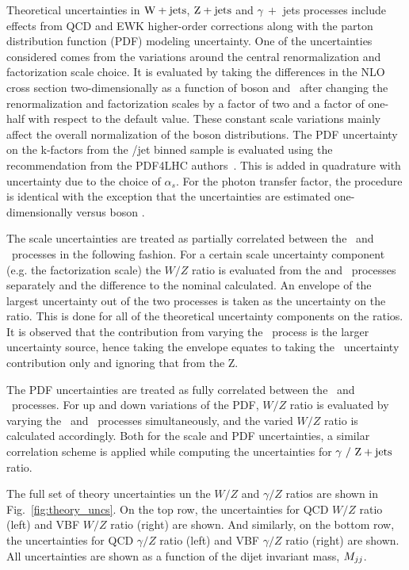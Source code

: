 Theoretical uncertainties in $\mathrm{W}+\textrm{jets}$, $\mathrm{Z}+\textrm{jets}$ and $\gamma \ +$ jets processes include effects from QCD and EWK higher-order
corrections along with the parton distribution function (PDF) modeling uncertainty. One of the uncertainties considered comes from the
variations around the central renormalization and factorization scale choice. It is evaluated by taking the differences in the NLO cross
section two-dimensionally as a function of boson \pt and \mjj~after changing the renormalization and factorization scales by a factor of two 
and a factor of one-half with respect to the default value. These constant scale variations mainly affect the
overall normalization of the boson \pt distributions. 
The PDF uncertainty on the k-factors from the \pt{}/jet binned sample is evaluated using the recommendation from the PDF4LHC authors~\cite{paper:PDF4LHC}. 
This is added in quadrature with uncertainty due to the choice of $\alpha_{s}$.
For the photon transfer factor, the procedure is identical with the exception that the uncertainties are estimated one-dimensionally versus boson \pt{}.

The scale uncertainties are treated as partially correlated between the \Zjets~and \Wjets~processes in the following fashion. 
For a certain scale uncertainty component (e.g. the factorization scale) the $W/Z$ ratio is evaluated from the \Zjets{} and \Wjets~processes 
separately and the difference to the nominal calculated.
An envelope of the largest uncertainty out of the two processes is taken as the uncertainty on the ratio.
This is done for all of the theoretical uncertainty components on the ratios.
It is observed that the contribution from varying the \Wjets~process is the larger uncertainty source,
hence taking the envelope equates to taking the \Wjets~uncertainty contribution only and ignoring that from the Z.

The PDF uncertainties are treated as fully correlated between the \Zjets~and \Wjets~processes. For up and down variations of the PDF, $W/Z$ ratio is 
evaluated by varying the \Wjets~and \Zjets~processes simultaneously, and the varied $W/Z$ ratio is calculated accordingly. 
Both for the scale and PDF uncertainties, a similar correlation scheme is applied while computing the uncertainties for $\gamma~/~\mathrm{Z}+\textrm{jets}$ ratio.

The full set of theory uncertainties un the $W/Z$ and $\gamma/Z$ ratios are shown in Fig.~\ref{fig:theory_uncs}. On the top row,
the uncertainties for QCD $W/Z$ ratio (left) and VBF $W/Z$ ratio (right) are shown. And similarly, on the bottom row,
the uncertainties for QCD $\gamma/Z$ ratio (left) and VBF $\gamma/Z$ ratio (right) are shown. All uncertainties are shown as a function
of the dijet invariant mass, $M_{jj}$. 

